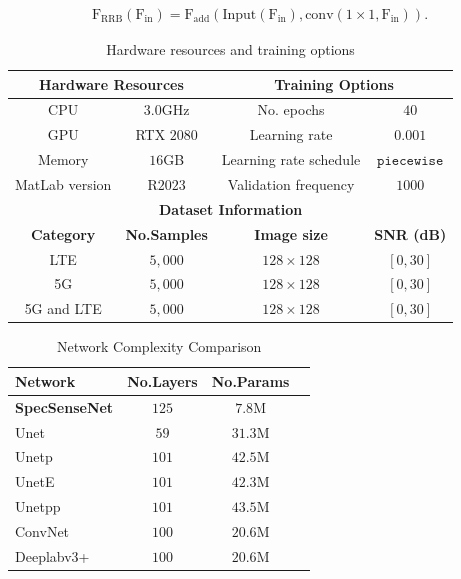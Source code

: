 \documentclass[journal]{IEEEtran} %
\begin{document}
\begin{equation}
\begin{aligned}
    \mathrm{F_{\text{RRB}}(F_{in}) = F_{\text{add}}(Input(F_{in}), conv(1\times1,F_{in}))}.
    \label{eq:RRB}
\end{aligned}
\end{equation}

\begin{table}[!t]
\centering
\caption{Hardware resources and training options}
\label{tab2}
\begin{tabular}{|c|c|c|c|}
\hline
\multicolumn{2}{|c|}{\textbf{Hardware Resources}} & \multicolumn{2}{c|}{\textbf{Training Options}} \\ \hline
CPU & $3.0$GHz & No. epochs & $40$ \\ 
GPU & RTX $2080$ & Learning rate & $0.001$ \\
Memory & $16$GB & Learning rate schedule & $\mathtt{piecewise}$ \\ 
MatLab version & R$2023$ & Validation frequency & $1000$ \\
\hline
\multicolumn{4}{|c|}{\textbf{Dataset Information}} \\
\hline
\textbf{Category} & \textbf{No.Samples} & \textbf{Image size} & \textbf{SNR (dB)}\\
\hline
LTE         & $5,000$ & $128 \times 128$ & $[0, 30]$ \\
5G          & $5,000$ & $128 \times 128$ & $[0, 30]$ \\
5G and LTE  & $5,000$ & $128 \times 128$ & $[0, 30]$ \\
\hline
\end{tabular}
\end{table}

\begin{table}[!t]
\centering
\caption{Network Complexity Comparison}
\label{tab1}
\begin{tabular}{|l|c|c|c|}
\hline
\textbf{Network} & \textbf{No.Layers} & \textbf{No.Params} \\
\hline
\textbf{SpecSenseNet} & $125$ & $7.8$M \\
Unet & $59$ & $31.3$M \\
Unetp & $101$ & $42.5$M  \\
UnetE & $101$ & $42.3$M \\
Unetpp & $101$ & $43.5$M  \\
ConvNet & $100$ & $20.6$M \\
Deeplabv3+ & $100$ & $20.6$M  \\
\hline
\end{tabular}
\end{table}
\end{document}
